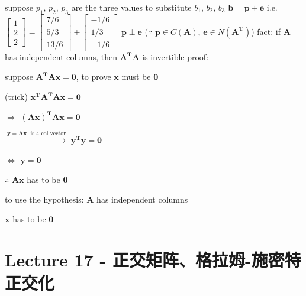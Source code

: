 \documentclass[12pt, a4paper]{article}
\begin{document}
{\newline
suppose $p_1$, $p_2$, $p_3$ are the three values to substitute $b_1$, $b_2$, $b_3$
\newline
${\mathbf{b}} = {\mathbf{p}} + {\mathbf{e}}$ \quad i.e. \quad  
\begin{math}
	\begin{bmatrix}
		1 \\
		2 \\
		2 
	\end{bmatrix}
	 = 
	\begin{bmatrix}
		7/6 \\
		5/3 \\
		13/6 
	\end{bmatrix}
	 + 
	\begin{bmatrix}
		-1/6 \\
		1/3 \\
		-1/6 
	\end{bmatrix}
\end{math}
\newline
${\mathbf{p}} \perp {\mathbf{e}}$ ($\because$ ${\mathbf{p}} \in C({\mathbf{A}})$, ${\mathbf{e}} \in N({\mathbf{A^{T}}})$)
\vspace{31pt}
\newline
{\textcolor{anhao-scarlet}{fact: if ${\mathbf{A}}$ has independent columns, then ${\mathbf{A^{T}}}{\mathbf{A}}$ is invertible}}
\newline
proof:
\par suppose ${\mathbf{A^{T}}}{\mathbf{A}}{\mathbf{x}} = {\mathbf{0}}$, to prove ${\mathbf{x}}$ must be ${\mathbf{0}}$
\par (trick) ${\mathbf{x^{T}}}{\mathbf{A^{T}}}{\mathbf{A}}{\mathbf{x}} = {\mathbf{0}}$
\par $\Longrightarrow$ $({\mathbf{Ax}})^{\mathbf{T}}{\mathbf{Ax}} = {\mathbf{0}}$
\par $\xrightarrow{{\mathbf{y}}={\mathbf{Ax}} {\text{, is a col vector}}}$ ${\mathbf{y^{T}}}{\mathbf{y}} = {\mathbf{0}}$
\par $\Longleftrightarrow$ ${\mathbf{y}} = {\mathbf{0}}$
\par $\therefore$ ${\mathbf{Ax}}$ has to be ${\mathbf{0}}$
\par to use the hypothesis: ${\mathbf{A}}$ has independent columns
\par ${\mathbf{x}}$ has to be ${\mathbf{0}}$

\newpage
\section{Lecture 17 - 正交矩阵、格拉姆-施密特正交化}
\pagestyle{fancy}
\lhead{}
\rhead{}

}
\end{document}
